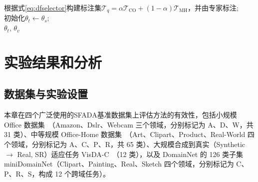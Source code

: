 \begin{algorithm}[!htb]
    \label{alg:damf}
    \small
    \BlankLine
    根据式\eqref{eq:dfselector}构建标注集$\mathcal{T}_q = \alpha\mathcal{T}_{\text{CO}} + (1-\alpha)\mathcal{T}_{\text{MH}}$，并由专家标注;\\
    \BlankLine
    \BlankLine
    初始化$\theta_t\leftarrow\theta_s$;\\
    \Return $\theta_t$, $\theta_v$
\end{algorithm}

\section{实验结果和分析}

\subsection{数据集与实验设置}

本章在四个广泛使用的SFADA基准数据集上评估方法的有效性，包括小规模 Office 数据集~\cite{saenko2010adapting}（Amazon、Dslr、Webcam 三个领域，分别标记为 A、D、W，共 31 类）、中等规模 Office-Home 数据集~\cite{venkateswara2017deep}（Art、Clipart、Product、Real-World 四个领域，分别标记为 A、C、P、R，共 65 类）、大规模合成到真实（Synthetic $\rightarrow$ Real, SR）适应任务 VisDA-C~\cite{peng2017visda}（12 类），以及 DomainNet 的 126 类子集 miniDomainNet（Clipart、Painting、Real、Sketch 四个领域，分别标记为 C、P、R、S，构成 12 个跨域任务）。

